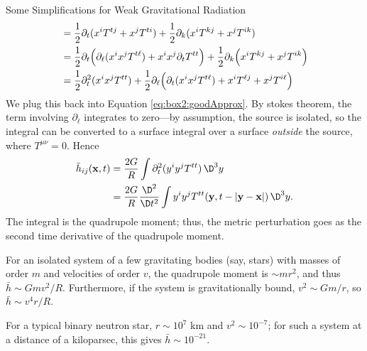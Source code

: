 \begin{Boxed}{Some Simplifications for Weak Gravitational Radiation}
\begin{align}
&=\frac{1}{2}\partial_{t}(x^{i}T^{tj}+x^{j}T^{ti})+
\frac{1}{2}\partial_{k}(x^{i}T^{kj}+x^{j}T^{ik})\nonumber\\
&=\frac{1}{2}\partial_{t}\Bigl(\partial_{\ell}(x^{i}x^{j}T^{t\ell})+x^{i}x^{j}\partial_{t}T^{tt}\Bigr)
+\frac{1}{2}\partial_{k}\Bigl(x^{i}T^{kj}+x^{j}T^{ik}\Bigr)\nonumber\\
&=\frac{1}{2}\partial_{t}^{2}(x^{i}x^{j}T^{tt})
+\frac{1}{2}\partial_{\ell}\Bigl(\partial_{t}(x^{i}x^{j}T^{t\ell})+x^{i}T^{\ell j}+x^{j}T^{i\ell}\Bigr)
\end{align}
We plug this back into Equation \eqref{eq:box2:goodApprox}. By
stokes theorem, the term involving $\partial_{\ell}$ integrates
to zero---by assumption, the source is isolated, so the integral
can be converted to a surface integral over a surface
\emph{outside} the source, where $T^{\mu\nu}=0$. Hence
\begin{equation}
\begin{split}
\bar{h}_{ij}(\mathbf{x},t)
&=\frac{2G}{R}\int\partial^{2}_{t}(y^{i}y^{j}T^{tt})\,\D^{3}y\\
&=\frac{2G}{R}\frac{\D^{2}}{\D t^{2}}\int y^{i}y^{j}T^{tt}(\mathbf{y},t-|\mathbf{y}-\mathbf{x}|)\,\D^{3}y.
\end{split}
\end{equation}
The integral is the quadrupole moment; thus, the metric
perturbation goes as the second time derivative of the quadrupole
moment.

For an isolated system of a few gravitating bodies (say, stars)
with masses of order $m$ and velocities of order $v$, the
quadrupole moment is $\sim mr^{2}$, and thus $\bar{h}\sim
Gmv^{2}/R$. Furthermore, if the system is gravitationally bound,
$v^{2}\sim Gm/r$, so $\bar{h}\sim v^{4}r/R$.

For a typical binary neutron star, $r\sim 10^{7}$ km and
$v^{2}\sim10^{-7}$; for such a system at a distance of a
kiloparsec, this gives $\bar{h}\sim10^{-21}$.
\end{Boxed}
